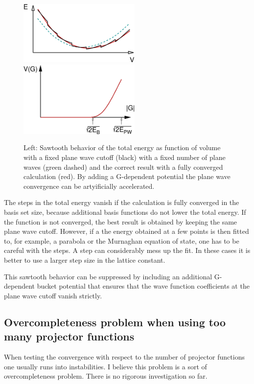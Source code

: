 \documentclass[final,12pt]{article}
\begin{document}
{{{\begin{figure}[h!]
\includegraphics[width=6cm]{Figs/Sawtooth/sawtooth.eps}
\includegraphics[width=6cm]{Figs/Gbucket/gbucket.eps}
\label{fig:sawtooth}
\caption{Left: Sawtooth behavior of the total energy as function of
volume with a fixed plane wave cutoff (black) with a fixed number of
plane waves (green dashed) and the correct result with a fully
converged calculation (red). By adding a G-dependent potential the
plane wave convergence can be artyificially accelerated.}
\end{figure}

The steps in the total energy vanish if the calculation is fully converged in
the basis set size, because additional basis functions do not lower the total
energy. If the function is not converged, the best result is obtained by
keeping the same plane wave cutoff. However, if a the energy obtained at a few
points is then fitted to, for example, a parabola or the Murnaghan equation of
state\cite{murnaghan44_pnas30_244}, one has to be careful with the steps. A
step can considerably mess up the fit. In these cases it is better to use a
larger step size in the lattice constant.

This sawtooth behavior can be suppressed by including an additional
G-dependent bucket potential that ensures that the wave function
coefficients at the plane wave cutoff vanish strictly.

\subsection{Overcompleteness problem when using too many projector functions}
When testing the convergence with respect to the number of projector
functions one usually runs into instabilities. I believe this problem
is a sort of overcompleteness problem. There is no rigorous
investigation so far.

}}}
\end{document}
